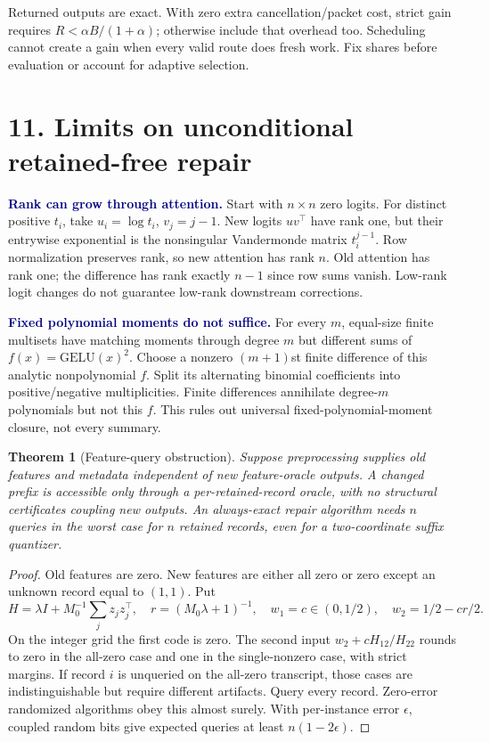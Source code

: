 \documentclass[11pt]{article}
\newtheorem{theorem}{Theorem}\newtheorem{lemma}{Lemma}\newtheorem{corollary}{Corollary}
\newcommand{\note}[1]{\textcolor{navy}{\textbf{#1}}}
\begin{document}
Returned outputs are exact. With zero extra cancellation/packet cost, strict gain requires $R<\alpha B/(1+\alpha)$; otherwise include that overhead too. Scheduling cannot create a gain when every valid route does fresh work. Fix shares before evaluation or account for adaptive selection.

\newpage
\section*{11. Limits on unconditional retained-free repair}
\note{Rank can grow through attention.} Start with $n\times n$ zero logits. For distinct positive $t_i$, take $u_i=\log t_i$, $v_j=j-1$. New logits $uv^{\top}$ have rank one, but their entrywise exponential is the nonsingular Vandermonde matrix $t_i^{j-1}$. Row normalization preserves rank, so new attention has rank $n$. Old attention has rank one; the difference has rank exactly $n-1$ since row sums vanish. Low-rank logit changes do not guarantee low-rank downstream corrections.

\note{Fixed polynomial moments do not suffice.} For every $m$, equal-size finite multisets have matching moments through degree $m$ but different sums of $f(x)=\mathrm{GELU}(x)^2$. Choose a nonzero $(m+1)$st finite difference of this analytic nonpolynomial $f$. Split its alternating binomial coefficients into positive/negative multiplicities. Finite differences annihilate degree-$m$ polynomials but not this $f$. This rules out universal fixed-polynomial-moment closure, not every summary.

\begin{theorem}[Feature-query obstruction]
Suppose preprocessing supplies old features and metadata independent of new feature-oracle outputs. A changed prefix is accessible only through a per-retained-record oracle, with no structural certificates coupling new outputs. An always-exact repair algorithm needs $n$ queries in the worst case for $n$ retained records, even for a two-coordinate suffix quantizer.
\end{theorem}
\begin{proof}
Old features are zero. New features are either all zero or zero except an unknown record equal to $(1,1)$. Put
\[
 H=\lambda I+M_0^{-1}\sum_jz_jz_j^{\top},\quad
 r=(M_0\lambda+1)^{-1},\quad
 w_1=c\in(0,1/2),\quad w_2=1/2-cr/2.
\]
On the integer grid the first code is zero. The second input $w_2+cH_{12}/H_{22}$ rounds to zero in the all-zero case and one in the single-nonzero case, with strict margins. If record $i$ is unqueried on the all-zero transcript, those cases are indistinguishable but require different artifacts. Query every record. Zero-error randomized algorithms obey this almost surely. With per-instance error $\epsilon$, coupled random bits give expected queries at least $n(1-2\epsilon)$.
\end{proof}
\end{document}

